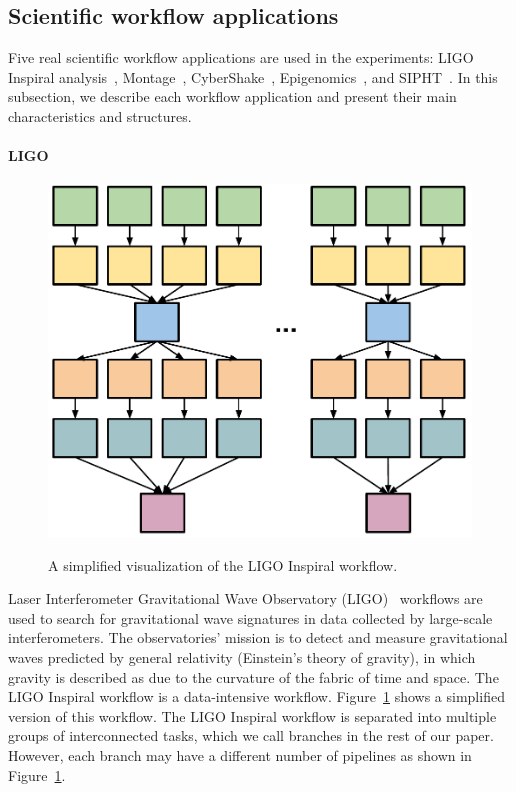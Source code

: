 \documentclass{IOS-Book-Article}
\begin{document}
\subsection{Scientific workflow applications}
\label{sec:applications}

Five real scientific workflow applications are used in the experiments: LIGO Inspiral analysis~\cite{LIGO}, Montage~\cite{Berriman2004}, CyberShake~\cite{Graves2010}, Epigenomics~\cite{Epigenome}, and SIPHT~\cite{SIPHT}. In this subsection, we describe each workflow application and present their main characteristics and structures.

\paragraph{\textbf{LIGO}}
\begin{figure}[!htb]
	\centering
	\includegraphics[width=0.5\linewidth]{ligo_shape.pdf} \\
	\caption{A simplified visualization of the LIGO Inspiral workflow.}
	\label{fig:evaluation_shape_ligo}
\end{figure}
Laser Interferometer Gravitational Wave Observatory (LIGO)~\cite{LIGO} workflows are used to search for gravitational wave signatures in data collected by large-scale interferometers. The observatories' mission is to detect and measure gravitational waves predicted by general relativity (Einstein's theory of gravity), in which gravity is described as due to the curvature of the fabric of time and space. The LIGO Inspiral workflow is a data-intensive workflow. Figure~\ref{fig:evaluation_shape_ligo} shows a simplified version of this workflow. The LIGO Inspiral workflow is separated into multiple groups of interconnected tasks, which we call branches in the rest of our paper. However, each branch may have a different number of pipelines as shown in Figure~\ref{fig:evaluation_shape_ligo}. 
\end{document}
